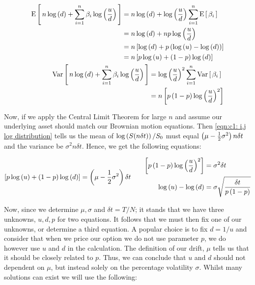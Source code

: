 \begin{align*}
    \begin{split}
        \text{E}\left[\,n\log\left(d\right) + \sum_{i=1}^n\beta_i\log\left(\frac{u}{d}\right)\,\right] &= n\log\left(d\right) + \log\left(\frac{u}{d}\right)\sum_{i=1}^n\text{E}\left[\,\beta_i\,\right] \\
    &= n\log\left(d\right) + np\log\left(\frac{u}{d}\right) \\
    &= n\left[\log\left(d\right) + p\left(\log\left(u \right) - \log\left(d \right)\right)\right] \\
    &= n\left[p\log\left(u \right) + \left(1-p\right)\log\left(d \right)\right]
    \end{split}
    \\
    \begin{split}
        \text{Var}\left[\,n\log\left(d\right) + \sum_{i=1}^n\beta_i\log\left(\frac{u}{d}\right)\,\right] &= \log\left(\frac{u}{d} \right)^2 \sum_{i=1}^n\text{Var}\left[\,\beta_i\,\right] \\
        &= n\left[p\left(1-p\right)\log\left(\frac{u}{d} \right)^2\right]
    \end{split}
\end{align*}

Now, if we apply the Central Limit Theorem for large \(n\) and assume our underlying asset should match our Brownian motion equations. Then \autoref{eqn:c1: i,j log distribution} tells us the mean of \({\log\left(S(n\delta t) \right)/{S_0}} \) must equal \(\left(\mu - \frac{1}{2}\sigma^2\right)n\delta t\) and the variance be \(\sigma^2n\delta t\). Hence, we get the following equations:

\begin{align}\label{eqn:c1:paramater match exp and var}
    \begin{split}
        \left[p\log\left(u \right) + \left(1-p\right)\log\left(d \right)\right] &= \left(\mu - \frac{1}{2}\sigma^2\right)\delta t
    \end{split}
    &&
    \begin{split}
        \left[p\left(1-p\right)\log\left(\frac{u}{d} \right)^2\right] &= \sigma^2\delta t \\
        \log\left(u \right) - \log\left(d \right) &= \sigma\sqrt{\frac{\delta t}{p\left(1-p\right)}}
    \end{split}
\end{align}

Now, since we determine \(\mu, \sigma \) and \(\delta t = {T}/{N} \); it stands that we have three unknowns, \(u, d, p\) for two equations. It follows that we must then fix one of our unknowns, or determine a third equation. A popular choice is to fix \(d = {1}/{u}\) and consider that when we price our option we do not use parameter \(p\), we do however use \(u \) and \(d \) in the calculation. The definition of our drift, \(\mu \) tells us that it should be closely related to \(p\). Thus, we can conclude that \(u \) and \(d \) should not dependent on \(\mu\), but instead solely on the percentage volatility \(\sigma\). Whilst many solutions can exist we will use the following:

